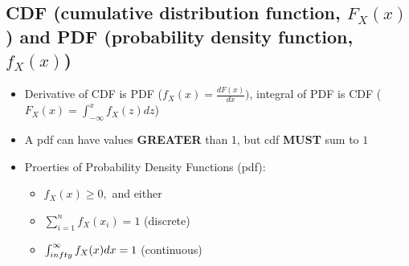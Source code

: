 \documentclass[10pt, oneside]{article}
\begin{document}
\subsection{CDF (cumulative distribution function, $F_X(x)$) and PDF (probability density function, $f_X(x)$)}
\begin{itemize}
    \item Derivative of CDF is PDF ($f_X(x)=\frac{dF(x)}{dx})$, integral of PDF is CDF ($F_X(x)=\int^x_{-\infty} f_X(z)dz$)
    \item A pdf can have values \textbf{GREATER} than 1, but cdf \textbf{MUST} sum to $1$
    \item Proerties of Probability Density Functions (pdf):
    \begin{itemize}
        \item $f_X(x)\geq 0,$ and either
        \item $\sum^n_{i=1}f_X(x_i)=1$ (discrete)
        \item $\int^{\infty}_{\-infty} f_X(x)dx = 1$ (continuous)
    \end{itemize}
\end{itemize}
\end{document}
